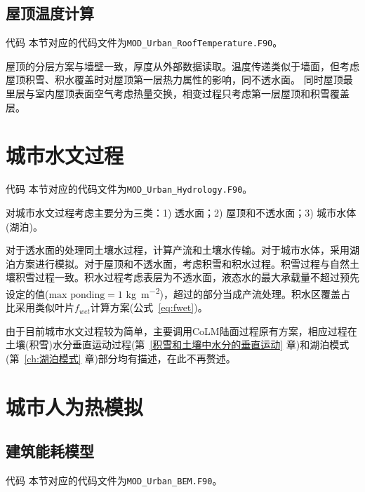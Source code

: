 \subsection{屋顶温度计算}

\begin{mymdframed}{代码}
本节对应的代码文件为\texttt{MOD\_Urban\_RoofTemperature.F90}。
\end{mymdframed}

屋顶的分层方案与墙壁一致，厚度从外部数据读取。温度传递类似于墙面，但考虑屋顶积雪、积水覆盖时对屋顶第一层热力属性的影响，同不透水面。
同时屋顶最里层与室内屋顶表面空气考虑热量交换，相变过程只考虑第一层屋顶和积雪覆盖层。


\section{城市水文过程}

\begin{mymdframed}{代码}
本节对应的代码文件为\texttt{MOD\_Urban\_Hydrology.F90}。
\end{mymdframed}

对城市水文过程考虑主要分为三类：1) 透水面；2) 屋顶和不透水面；3) 城市水体(湖泊)。

对于透水面的处理同土壤水过程，计算产流和土壤水传输。对于城市水体，采用湖泊方案进行模拟。对于屋顶和不透水面，考虑积雪和积水过程。积雪过程与自然土壤积雪过程一致。积水过程考虑表层为不透水面，液态水的最大承载量不超过预先设定的值($\text{max ponding}=1$ \unit{kg.m^{-2}})，超过的部分当成产流处理。积水区覆盖占比采用类似叶片$f_{wet}$计算方案(公式~\ref{eq:fwet})。

由于目前城市水文过程较为简单，主要调用CoLM陆面过程原有方案，相应过程在土壤(积雪)水分垂直运动过程(第~\ref{积雪和土壤中水分的垂直运动} 章)和湖泊模式(第~\ref{ch:湖泊模式} 章)部分均有描述，在此不再赘述。


\section{城市人为热模拟}

\subsection{建筑能耗模型}\label{建筑能耗模型}

\begin{mymdframed}{代码}
本节对应的代码文件为\texttt{MOD\_Urban\_BEM.F90}。
\end{mymdframed}

